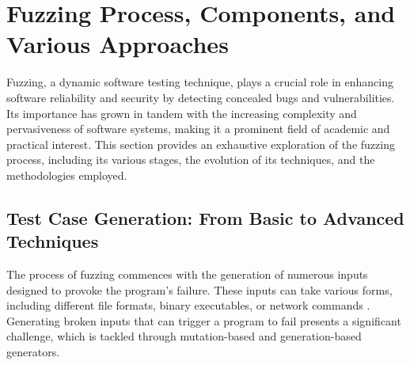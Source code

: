 

\section{Fuzzing Process, Components, and Various Approaches}\label{sec:fuzzing_methods}
Fuzzing, a dynamic software testing technique, plays a crucial role in enhancing
software reliability and security by detecting concealed bugs and
vulnerabilities. Its importance has grown in tandem with the increasing
complexity and pervasiveness of software systems, making it a prominent
field of academic and practical interest. This section provides an exhaustive
exploration of the fuzzing process, including its various stages, the evolution
of its techniques, and the methodologies employed.

\subsection{Test Case Generation: From Basic to Advanced Techniques}
The process of fuzzing commences with the generation of numerous inputs
designed to provoke the program's failure. These inputs can take various forms,
including different file formats, binary executables, or network commands
\cite{mcnally2012fuzzing}\cite{bohme2020fuzzing}\cite{manes2019art}.
Generating broken inputs that can trigger a program to fail presents a
significant challenge, which is tackled through mutation-based\cite{miller2007analysis}\cite{lyu2022ems} and
generation-based generators\cite{pang2023generation}.

